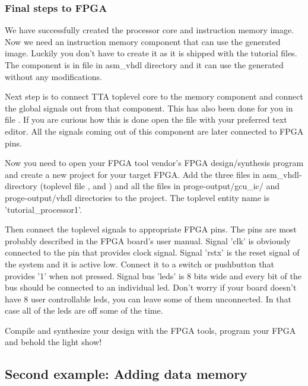 \documentclass[a4paper,twoside]{tceusermanual}
\begin{document}


\subsubsection{Final steps to FPGA}
We have successfully created the processor core and instruction memory image.
Now we need an instruction memory component that can use the generated image.
Luckily you don't have to create it as it is shipped with the tutorial files.
The component is in file  in asm\_vhdl directory
and it can use the generated  without any
modifications.

Next step is to connect TTA toplevel core to the memory component and connect
the global signals out from that component. This has also been done for you in
file . If you are curious how this is done
open the file with your preferred text editor. All the signals coming out of
this component are later connected to FPGA pins.

Now you need to open your FPGA tool vendor's FPGA design/synthesis program and
create a new project for your target FPGA. Add the three files in 
asm\_vhdl-directory (toplevel file , 
 and ) and all the
files in proge-output/gcu\_ic/ and proge-output/vhdl directories to the
project. The toplevel entity name is 'tutorial\_processor1'.

Then connect the toplevel signals to appropriate FPGA pins. The pins are most
probably described in the FPGA board's user manual. Signal 'clk' is obviously
connected to the pin that provides clock signal. Signal 'rstx' is the reset
signal of the system and it is active low. Connect it to a switch or
pushbutton that provides '1' when not pressed. Signal bus 'leds' is 8 bits
wide and every bit of the bus should be connected to an individual led. Don't
worry if your board doesn't have 8 user controllable leds, you can leave some
of them unconnected. In that case all of the leds are off some of the time.

Compile and synthesize your design with the FPGA tools, program your FPGA and
behold the light show!

\subsection{Second example: Adding data memory}
\end{document}
